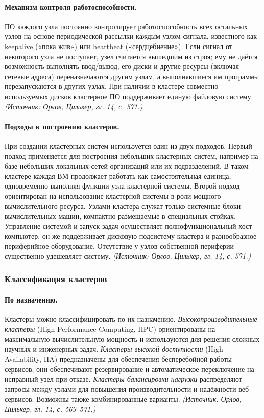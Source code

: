 \documentclass[a4paper,12pt]{article}
\begin{document}
\paragraph{Механизм контроля работоспособности.}
ПО каждого узла постоянно контролирует работоспособность всех остальных узлов на основе периодической рассылки каждым узлом сигнала, известного как keepalive («пока жив») или heartbeat («сердцебиение»). Если сигнал от некоторого узла не поступает, узел считается вышедшим из строя; ему не даётся возможность выполнять ввод/вывод, его диски и другие ресурсы (включая сетевые адреса) переназначаются другим узлам, а выполнявшиеся им программы перезапускаются в других узлах. При наличии в кластере совместно используемых дисков кластерное ПО поддерживает единую файловую систему.
\textit{(Источник: Орлов, Цилькер, гл. 14, с. 571.)}

\paragraph{Подходы к построению кластеров.}
При создании кластерных систем используется один из двух подходов. Первый подход применяется для построения небольших кластерных систем, например на базе небольших локальных сетей организаций или их подразделений. В таком кластере каждая ВМ продолжает работать как самостоятельная единица, одновременно выполняя функции узла кластерной системы. Второй подход ориентирован на использование кластерной системы в роли мощного вычислительного ресурса. Узлами кластера служат только системные блоки вычислительных машин, компактно размещаемые в специальных стойках. Управление системой и запуск задач осуществляет полнофункциональный хост-компьютер; он же поддерживает дисковую подсистему кластера и разнообразное периферийное оборудование. Отсутствие у узлов собственной периферии существенно удешевляет систему.
\textit{(Источник: Орлов, Цилькер, гл. 14, с. 571.)}

\subsubsection{Классификация кластеров}

\paragraph{По назначению.}
Кластеры можно классифицировать по их назначению. \emph{Высокопроизводительные кластеры} (High Performance Computing, HPC) ориентированы на максимальную вычислительную мощность и используются для решения сложных научных и инженерных задач. \emph{Кластеры высокой доступности} (High Availability, HA) предназначены для обеспечения бесперебойной работы сервисов; они обеспечивают резервирование и автоматическое переключение на исправный узел при отказе. \emph{Кластеры балансировки нагрузки} распределяют запросы между узлами для повышения производительности и надёжности веб-сервисов. Возможны также комбинированные варианты.
\textit{(Источник: Орлов, Цилькер, гл. 14, с. 569--571.)}
\end{document}
